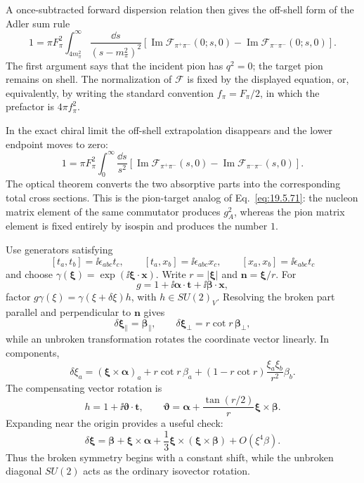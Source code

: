 \begin{enumerate}
  A once-subtracted forward dispersion relation then gives the
  off-shell form of the Adler sum rule
  \[
    \boxed{
    1=\pi F_\pi^2
      \int_{4m_\pi^2}^{\infty}
      \frac{\dd s}{(s-m_\pi^2)^2}
      \left[
       \operatorname{Im}\mathcal F_{\pi^+\pi^-}(0;s,0)
       -\operatorname{Im}\mathcal F_{\pi^-\pi^-}(0;s,0)
      \right].}
  \]
  The first argument says that the incident pion has \(q^2=0\); the
  target pion remains on shell.  The normalization of
  \(\mathcal F\) is fixed by the displayed equation, or, equivalently,
  by writing the standard convention \(f_\pi=F_\pi/2\), in which the
  prefactor is \(4\pi f_\pi^2\).

  In the exact chiral limit the off-shell extrapolation disappears and
  the lower endpoint moves to zero:
  \[
    \boxed{
    1=\pi F_\pi^2
      \int_0^\infty\frac{\dd s}{s^2}
      \left[
       \operatorname{Im}\mathcal F_{\pi^+\pi^-}(s,0)
       -\operatorname{Im}\mathcal F_{\pi^-\pi^-}(s,0)
      \right].}
  \]
  The optical theorem converts the two absorptive parts into the
  corresponding total cross sections.  This is the pion-target analog
  of Eq.~\eqref{eq:19.5.71}: the nucleon matrix element of the same
  commutator produces \(g_A^2\), whereas the pion matrix element is fixed
  entirely by isospin and produces the number \(1\).

  Use generators satisfying
  \[
    [t_a,t_b]=\ii\epsilon_{abc}t_c,\qquad
    [t_a,x_b]=\ii\epsilon_{abc}x_c,\qquad
    [x_a,x_b]=\ii\epsilon_{abc}t_c
  \]
  and choose
  \(\gamma(\boldsymbol\xi)=\exp(\ii\boldsymbol\xi\cdot\boldsymbol x)\).
  Write \(r=|\boldsymbol\xi|\) and
  \(\boldsymbol n=\boldsymbol\xi/r\).  For
  \[
    g=1+\ii\boldsymbol\alpha\cdot\boldsymbol t
       +\ii\boldsymbol\beta\cdot\boldsymbol x,
  \]
  factor
  \(g\gamma(\xi)=\gamma(\xi+\delta\xi)h\), with \(h\in SU(2)_V\).
  Resolving the broken part parallel and perpendicular to
  \(\boldsymbol n\) gives
  \[
    \delta\boldsymbol\xi_{\parallel}
      =\boldsymbol\beta_{\parallel},\qquad
    \delta\boldsymbol\xi_{\perp}
      =r\cot r\,\boldsymbol\beta_{\perp},
  \]
  while an unbroken transformation rotates the coordinate vector
  linearly.  In components,
  \[
    \boxed{
    \delta\xi_a
      =(\boldsymbol\xi\times\boldsymbol\alpha)_a
       +r\cot r\,\beta_a
       +(1-r\cot r)
        \frac{\xi_a\xi_b}{r^2}\beta_b.}
  \]
  The compensating vector rotation is
  \[
    h=1+\ii\boldsymbol\vartheta\cdot\boldsymbol t,\qquad
    \boldsymbol\vartheta
      =\boldsymbol\alpha+
       \frac{\tan(r/2)}{r}
       \boldsymbol\xi\times\boldsymbol\beta.
  \]
  Expanding near the origin provides a useful check:
  \[
    \delta\boldsymbol\xi
      =\boldsymbol\beta+\boldsymbol\xi\times\boldsymbol\alpha
       +\frac13\boldsymbol\xi\times
        (\boldsymbol\xi\times\boldsymbol\beta)+O(\xi^4\beta).
  \]
  Thus the broken symmetry begins with a constant shift, while the
  unbroken diagonal \(SU(2)\) acts as the ordinary isovector rotation.


\end{enumerate}
